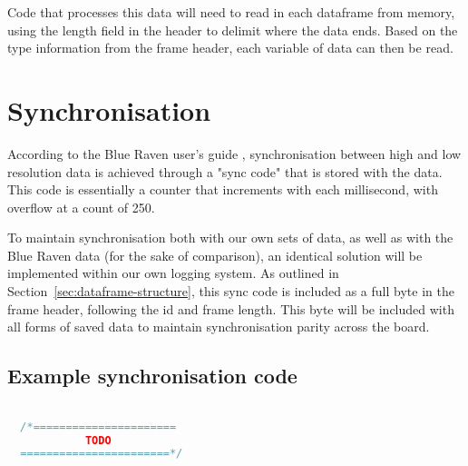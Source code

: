 Code that processes this data will need to read in each dataframe from memory, using the length field in the header to delimit where the data ends. Based on the type information from the frame header, each variable of data can then be read.

\section{Synchronisation}\label{sec:synchronisation}
According to the Blue Raven user's guide \cite{adamson_2023}, synchronisation between high and low resolution data is achieved through a "sync code" that is stored with the data. This code is essentially a counter that increments with each millisecond, with overflow at a count of 250. 

To maintain synchronisation both with our own sets of data, as well as with the Blue Raven data (for the sake of comparison), an identical solution will be implemented within our own logging system. As outlined in Section~\ref{sec:dataframe-structure}, this sync code is included as a full byte in the frame header, following the id and frame length. This byte will be included with all forms of saved data to maintain synchronisation parity across the board.

\subsection{Example synchronisation code}

\begin{lstlisting}[language=c++, breaklines=true]

  /*======================
            TODO
  =======================*/

\end{lstlisting}

